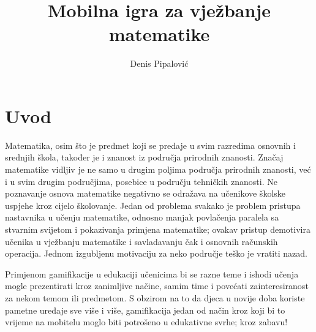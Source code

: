 \documentclass[times, utf8, zavrsni, numeric]{fer}
\begin{document}

\title{Mobilna igra za vježbanje matematike}

\author{Denis Pipalović}

\maketitle



\zahvala{}

\tableofcontents

\chapter{Uvod}
	Matematika, osim što je predmet koji se predaje u svim razredima osnovnih i srednjih škola, također je i znanost iz područja prirodnih znanosti.
Značaj matematike vidljiv je ne samo u drugim poljima područja prirodnih znanosti, već i u svim drugim područjima, posebice u području tehničkih znanosti.
Ne poznavanje osnova matematike negativno se odražava na učenikove školske uspjehe kroz cijelo školovanje\cite{matematika}. Jedan od problema svakako je problem pristupa nastavnika
 u učenju matematike, odnosno manjak povlačenja paralela sa stvarnim svijetom i pokazivanja primjena matematike; ovakav pristup demotivira učenika u vježbanju matematike
i savladavanju čak i osnovnih računskih operacija. Jednom izgubljenu motivaciju za neko područje teško je vratiti nazad.

Primjenom gamifikacije\cite{gamification} u edukaciji učenicima bi se razne teme i ishodi učenja mogle prezentirati kroz zanimljive načine, samim time i povećati zainteresiranost za nekom temom 
ili predmetom. S obzirom na to da djeca u novije doba koriste pametne uređaje sve više i više, gamifikacija jedan od način kroz koji bi to vrijeme na mobitelu moglo biti potrošeno
 u edukativne svrhe; kroz zabavu!
\end{document}
